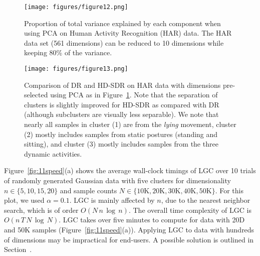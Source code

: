 \documentclass[sagev,Afour,times]{sagej}
\begin{document}
\begin{figure}[htb]
    \centering
    \texttt{[image: figures/figure12.png]}
    \parbox[t]{1\columnwidth}{\relax}
    \caption{\label{fig:pca_total_variance} Proportion of total variance explained by each component when using PCA on Human Activity Recognition (HAR) data. The HAR data set (561 dimensions) can be reduced to 10 dimensions while keeping 80\% of the variance.}
\end{figure}

\begin{figure}[htb]
    \centering
    \texttt{[image: figures/figure13.png]}
    \parbox[t]{1\columnwidth}{\relax}
    \caption{\label{fig:pca_for_fdr_projections} Comparison of DR and HD-SDR on HAR data with dimensions pre-selected using PCA as in Figure~\ref{fig:pca_total_variance}. Note that the separation of clusters is slightly improved for HD-SDR as compared with DR (although subclusters are visually less separable). We note that nearly all samples in cluster (1) are from the \emph{lying} movement, cluster (2) mostly includes samples from static postures (standing and sitting), and cluster (3) mostly includes samples from the three dynamic activities.}
\end{figure}

Figure~\ref{fig:11speed}(a) shows the average wall-clock timings of LGC over 10 trials of randomly generated Gaussian data with five clusters for dimensionality $n \in \{5, 10, 15, 20\}$ and sample counts $N \in \{10\mathrm{K}, 20\mathrm{K}, 30\mathrm{K}, 40\mathrm{K}, 50\mathrm{K}\}$. For this plot, we used $\alpha=0.1$. LGC is mainly affected by $n$, due to the nearest neighbor search, which is of order $O(N\,n\,\log\,n)$. The overall time complexity of LGC is $O(n\,T\,N\,\log\,N)$. LGC takes over five minutes to compute for data with 20D and 50$\mathrm{K}$ samples (Figure~\ref{fig:11speed}(a)). Applying LGC to data with hundreds of dimensions may be impractical for end-users. A possible solution is outlined in Section~. 
\end{document}
